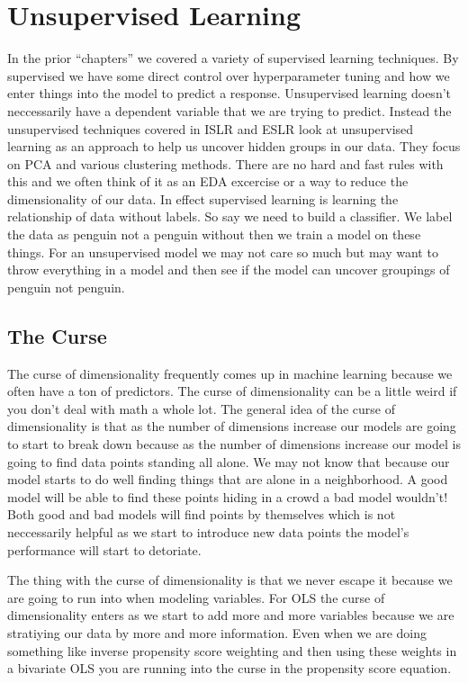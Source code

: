 \documentclass[
  letterpaper,
  DIV=11,
  numbers=noendperiod]{scrreprt}
\begin{document}

\chapter{Unsupervised Learning}\label{unsupervised-learning}

In the prior ``chapters'' we covered a variety of supervised learning
techniques. By supervised we have some direct control over
hyperparameter tuning and how we enter things into the model to predict
a response. Unsupervised learning doesn't neccessarily have a dependent
variable that we are trying to predict. Instead the unsupervised
techniques covered in ISLR and ESLR look at unsupervised learning as an
approach to help us uncover hidden groups in our data. They focus on PCA
and various clustering methods. There are no hard and fast rules with
this and we often think of it as an EDA excercise or a way to reduce the
dimensionality of our data. In effect supervised learning is learning
the relationship of data without labels. So say we need to build a
classifier. We label the data as penguin not a penguin without then we
train a model on these things. For an unsupervised model we may not care
so much but may want to throw everything in a model and then see if the
model can uncover groupings of penguin not penguin.

\section{The Curse}\label{the-curse}

The curse of dimensionality frequently comes up in machine learning
because we often have a ton of predictors. The curse of dimensionality
can be a little weird if you don't deal with math a whole lot. The
general idea of the curse of dimensionality is that as the number of
dimensions increase our models are going to start to break down because
as the number of dimensions increase our model is going to find data
points standing all alone. We may not know that because our model starts
to do well finding things that are alone in a neighborhood. A good model
will be able to find these points hiding in a crowd a bad model
wouldn't! Both good and bad models will find points by themselves which
is not neccessarily helpful as we start to introduce new data points the
model's performance will start to detoriate.

The thing with the curse of dimensionality is that we never escape it
because we are going to run into when modeling variables. For OLS the
curse of dimensionality enters as we start to add more and more
variables because we are stratiying our data by more and more
information. Even when we are doing something like inverse propensity
score weighting and then using these weights in a bivariate OLS you are
running into the curse in the propensity score equation.
\end{document}
